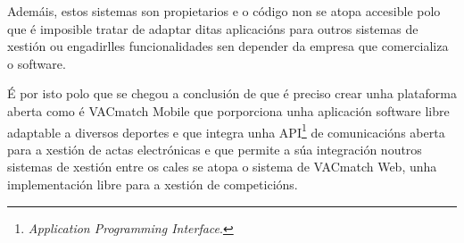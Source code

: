   Ademáis, estos sistemas son propietarios e o código non se atopa accesible 
polo que é imposible tratar de adaptar ditas aplicacións para outros 
sistemas de xestión ou engadirlles funcionalidades sen depender da empresa 
que comercializa o software.

  É por isto polo que se chegou a conclusión de que é preciso crear unha 
plataforma aberta como é VACmatch Mobile que porporciona unha aplicación 
software libre adaptable a diversos deportes e que integra unha 
API\footnote{\emph{Application Programming Interface}.} 
de comunicacións aberta para a xestión de actas electrónicas e que permite a 
súa integración noutros sistemas de xestión entre os cales se atopa o sistema 
de VACmatch Web, unha implementación libre para a xestión de competicións.


